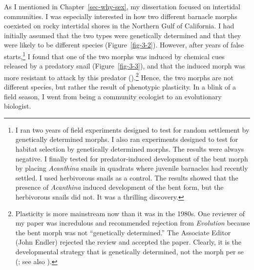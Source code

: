 \documentclass[
  letterpaper,
]{book}
\begin{document}
As I mentioned in Chapter~\ref{sec-why-sex}, my dissertation focused on
intertidal communities. I was especially interested in how two different
barnacle morphs coexisted on rocky intertidal shores in the Northern
Gulf of California. I had initially assumed that the two types were
genetically determined and that they were likely to be different species
(Figure~\ref{fig-3-2}). However, after years of false starts,\footnote{I
  ran two years of field experiments designed to test for random
  settlement by genetically determined morphs. I also ran experiments
  designed to test for habitat selection by genetically determined
  morphs. The results were always negative. I finally tested for
  predator-induced development of the bent morph by placing
  \emph{Acanthina} snails in quadrats where juvenile barnacles had
  recently settled. I used herbivorous snails as a control. The results
  showed that the presence of \emph{Acanthina} induced development of
  the bent form, but the herbivorous snails did not. It was a thrilling
  discovery.} I found that one of the two morphs was induced by chemical
cues released by a predatory snail (Figure~\ref{fig-3-3}), and that the
induced morph was more resistant to attack by this predator
().\footnote{Plasticity is more
  mainstream now than it was in the 1980s. One reviewer of my paper was
  incredulous and recommended rejection from \emph{Evolution} because
  the bent morph was not ``genetically determined.'' The Associate
  Editor (John Endler) rejected the review and accepted the paper.
  Clearly, it is the developmental strategy that is genetically
  determined, not the morph per se (; see also ).} Hence, the two morphs are not different
species, but rather the result of phenotypic plasticity. In a blink of a
field season, I went from being a community ecologist to an evolutionary
biologist.
\end{document}
